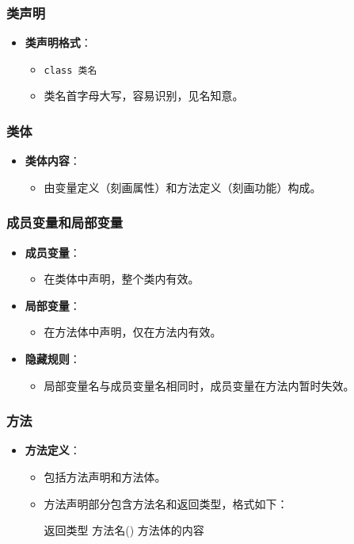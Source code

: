 \documentclass[a4paper, 10pt]{ctexart}
\begin{document}
\subsubsection{类声明}
\begin{itemize}
  \item \textbf{类声明格式}：
  \begin{itemize}
    \item \texttt{class 类名}
    \item 类名首字母大写，容易识别，见名知意。
  \end{itemize}
\end{itemize}

\subsubsection{类体}
\begin{itemize}
  \item \textbf{类体内容}：
  \begin{itemize}
    \item 由变量定义（刻画属性）和方法定义（刻画功能）构成。
  \end{itemize}
\end{itemize}

\subsubsection{成员变量和局部变量}
\begin{itemize}
  \item \textbf{成员变量}：
  \begin{itemize}
    \item 在类体中声明，整个类内有效。
  \end{itemize}
  \item \textbf{局部变量}：
  \begin{itemize}
    \item 在方法体中声明，仅在方法内有效。
  \end{itemize}
  \item \textbf{隐藏规则}：
  \begin{itemize}
    \item 局部变量名与成员变量名相同时，成员变量在方法内暂时失效。
  \end{itemize}
\end{itemize}

\subsubsection{方法}
\begin{itemize}
  \item \textbf{方法定义}：
  \begin{itemize}
    \item 包括方法声明和方法体。
    \item 方法声明部分包含方法名和返回类型，格式如下：
    \begin{codeblock}
返回类型 方法名() {
    方法体的内容
}
    \end{codeblock}
  \end{itemize}
\end{itemize}
\end{document}
